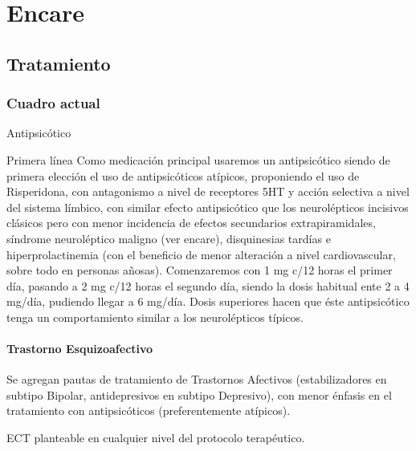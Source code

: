 \section*{Encare}
\subsection*{Tratamiento}
\subsubsection*{Cuadro actual}
Antipsicótico

Primera línea Como medicación principal usaremos un antipsicótico siendo de primera elección el uso de antipsicóticos atípicos, proponiendo el uso de Risperidona, con antagonismo a nivel de receptores 5HT y acción selectiva a nivel del sistema límbico, con similar efecto antipsicótico que los neurolépticos incisivos clásicos pero con menor incidencia de efectos secundarios extrapiramidales, síndrome neuroléptico maligno (ver encare), disquinesias tardías e hiperprolactinemia (con el beneficio de menor alteración a nivel cardiovascular, sobre todo en personas añosas). Comenzaremos con 1 mg c/12 horas el primer día, pasando a 2 mg c/12 horas el segundo día, siendo la dosis habitual ente 2 a 4 mg/día, pudiendo llegar a 6 mg/día. Dosis superiores hacen que éste antipsicótico tenga un comportamiento similar a los neurolépticos típicos.

\paragraph{Trastorno Esquizoafectivo}
Se agregan pautas de tratamiento de Trastornos Afectivos (estabilizadores en subtipo Bipolar, antidepresivos en subtipo Depresivo), con menor énfasis en el tratamiento con antipsicóticos (preferentemente atípicos).

ECT planteable en cualquier nivel del protocolo terapéutico.

